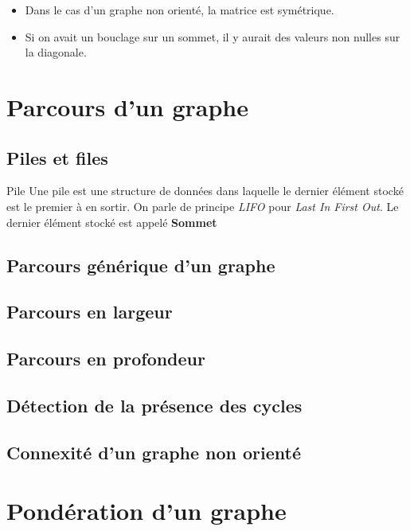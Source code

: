 \begin{rem}
\begin{itemize}
\item Dans le cas d'un graphe non orienté, la matrice est symétrique. 
\item Si on avait un bouclage sur un sommet, il y aurait des valeurs non nulles sur la diagonale. 
\end{itemize}
\end{rem}

\section{Parcours d'un graphe}
\subsection{Piles et files}


\begin{defi}{Pile}
Une pile est une structure de données dans laquelle le dernier élément stocké est le premier à en sortir. On parle de principe \textit{LIFO} pour \textit{Last In First Out}. Le dernier élément stocké est appelé \textbf{Sommet}
\end{defi}

\subsection{Parcours générique d'un graphe}

\subsection{Parcours en largeur}

\subsection{Parcours en profondeur}

\subsection{Détection de la présence des cycles}

\subsection{Connexité d'un graphe non orienté}

\section{Pondération d'un graphe}




